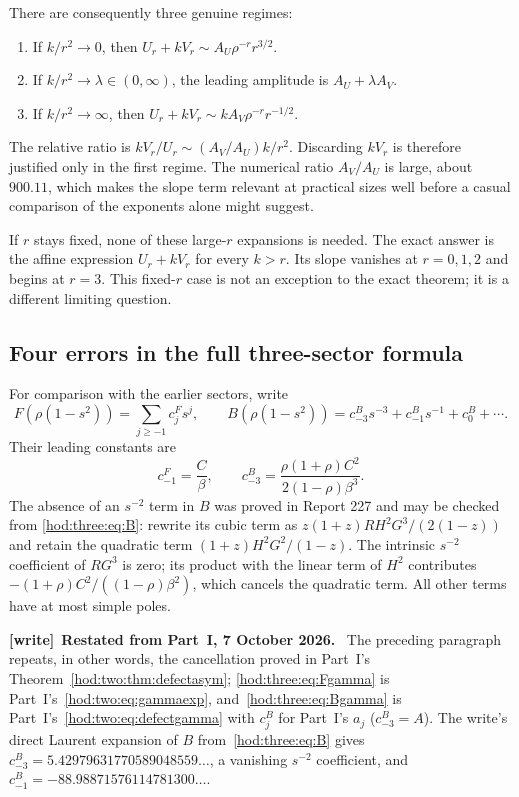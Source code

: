 \documentclass[11pt,letterpaper]{article}
\theoremstyle{definition}\newtheorem{definition}[theorem]{Definition}
\theoremstyle{remark}\newtheorem{remark}[theorem]{Remark}
\newenvironment{writenote}[1][]{\par\smallskip\begingroup\small
 \noindent\textbf{[write]}\if\relax\detokenize{#1}\relax\else~\textbf{#1.}\fi\ }%
 {\par\endgroup\smallskip}
\begin{document}
There are consequently three genuine regimes:
\begin{enumerate}
\item If $k/r^2\to0$, then $U_r+kV_r\sim A_U\rho^{-r}r^{3/2}$.
\item If $k/r^2\to\lambda\in(0,\infty)$, the leading amplitude is $A_U+\lambda A_V$.
\item If $k/r^2\to\infty$, then $U_r+kV_r\sim kA_V\rho^{-r}r^{-1/2}$.
\end{enumerate}
The relative ratio is $kV_r/U_r\sim(A_V/A_U)k/r^2$. Discarding $kV_r$ is therefore justified only in the first regime. The numerical ratio $A_V/A_U$ is large, about $900.11$, which makes the slope term relevant at practical sizes well before a casual comparison of the exponents alone might suggest.

If $r$ stays fixed, none of these large-$r$ expansions is needed. The exact answer is the affine expression $U_r+kV_r$ for every $k>r$. Its slope vanishes at $r=0,1,2$ and begins at $r=3$. This fixed-$r$ case is not an exception to the exact theorem; it is a different limiting question.

\subsection{Four errors in the full three-sector formula}\label{hod:three:sec:fourerrors}
For comparison with the earlier sectors, write
\[
F(\rho(1-s^2))=\sum_{j\ge-1}c^F_js^j,\qquad
B(\rho(1-s^2))=c^B_{-3}s^{-3}+c^B_{-1}s^{-1}+c^B_0+\cdots.
\]
Their leading constants are
\[
c^F_{-1}=\frac C\beta,\qquad
c^B_{-3}=\frac{\rho(1+\rho)C^2}{2(1-\rho)\beta^3}.
\]
The absence of an $s^{-2}$ term in $B$ was proved in Report 227 and may be checked from \eqref{hod:three:eq:B}: rewrite its cubic term as $z(1+z)RH^2G^3/(2(1-z))$ and retain the quadratic term $(1+z)H^2G^2/(1-z)$. The intrinsic $s^{-2}$ coefficient of $RG^3$ is zero; its product with the linear term of $H^2$ contributes $-(1+\rho)C^2/((1-\rho)\beta^2)$, which cancels the quadratic term. All other terms have at most simple poles.
\begin{writenote}[Restated from Part~I, 7 October 2026]
The preceding paragraph repeats, in other words, the cancellation proved in
Part~I's Theorem~\ref{hod:two:thm:defectasym}; \eqref{hod:three:eq:Fgamma}
is Part~I's~\eqref{hod:two:eq:gammaexp}, and~\eqref{hod:three:eq:Bgamma} is
Part~I's~\eqref{hod:two:eq:defectgamma} with $c^B_j$ for Part~I's $a_j$
($c^B_{-3}=A$). The write's direct Laurent expansion of $B$
from~\eqref{hod:three:eq:B} gives $c^B_{-3}=5.42979631770589048559\ldots$, a
vanishing $s^{-2}$ coefficient, and $c^B_{-1}=-88.98871576114781300\ldots$.
\end{writenote}
\end{document}
